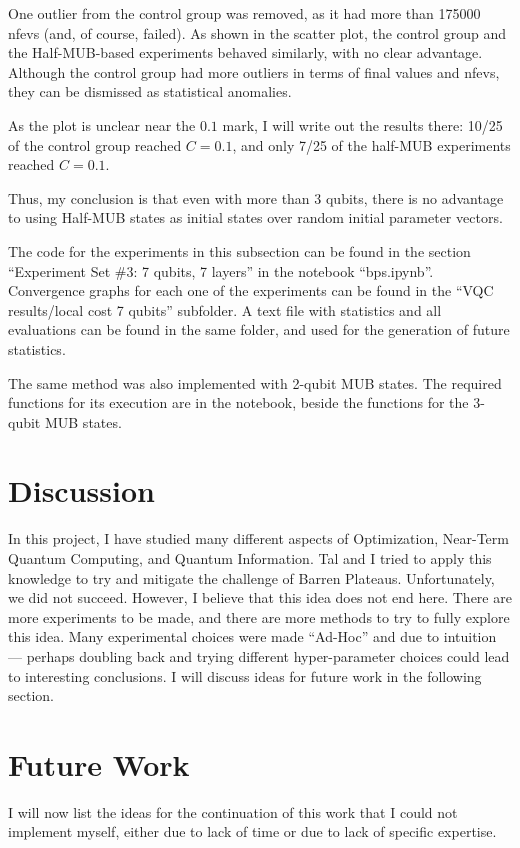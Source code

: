 \documentclass[a4paper,12pt]{article}
\begin{document}
One outlier from the control group was removed, as it had more than 175000 nfevs (and, of course, failed).
As shown in the scatter plot, the control group and the Half-MUB-based experiments behaved similarly, with no clear advantage.
Although the control group had more outliers in terms of final values and nfevs, they can be dismissed as statistical anomalies.

As the plot is unclear near the $0.1$ mark, I will write out the results there: 10/25 of the control group reached $C=0.1$, and only 7/25 of the half-MUB experiments reached $C=0.1$.

Thus, my conclusion is that even with more than 3 qubits, there is no advantage to using Half-MUB states as initial states over random initial parameter vectors.

The code for the experiments in this subsection can be found in the section ``Experiment Set \#3: 7 qubits, 7 layers'' in the notebook ``bps.ipynb''.
Convergence graphs for each one of the experiments can be found in the ``VQC results/local cost 7 qubits'' subfolder. A text file with statistics and all evaluations can be found in the same folder, and used for the generation of future statistics.

The same method was also implemented with 2-qubit MUB states.
The required functions for its execution are in the notebook, beside the functions for the 3-qubit MUB states.


\section{Discussion}
In this project, I have studied many different aspects of Optimization, Near-Term Quantum Computing, and Quantum Information.
Tal and I tried to apply this knowledge to try and mitigate the challenge of Barren Plateaus. Unfortunately, we did not succeed. However, I believe that this idea does not end here.
There are more experiments to be made, and there are more methods to try to fully explore this idea.
Many experimental choices were made ``Ad-Hoc'' and due to intuition --- perhaps doubling back and trying different hyper-parameter choices could lead to interesting conclusions.
I will discuss ideas for future work in the following section.

\section{Future Work}
I will now list the ideas for the continuation of this work that I could not implement myself, either due to lack of time or due to lack of specific expertise.
\end{document}
